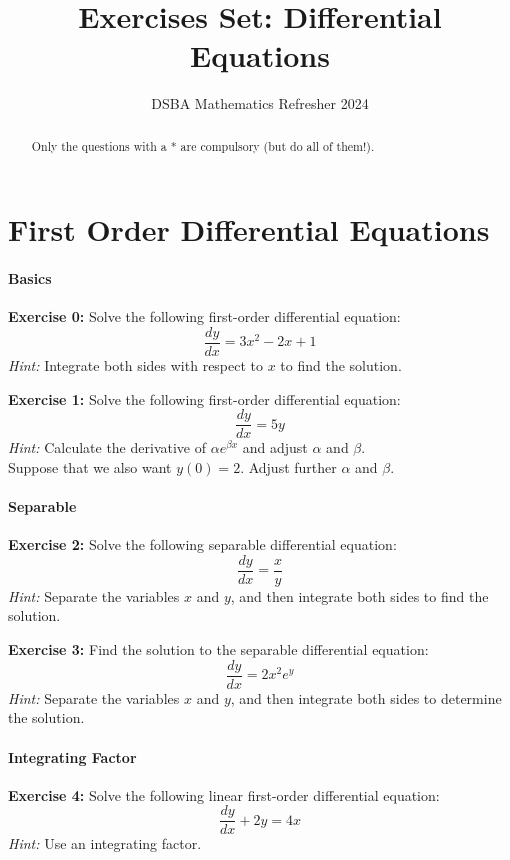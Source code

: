 \documentclass[]{article}
\title{Exercises Set: Differential Equations}
\author{DSBA Mathematics Refresher 2024}
\date{}
\begin{document}
	\maketitle
	
	\begin{abstract}
		Only the questions with a * are compulsory (but do all of them!).
	\end{abstract}	
	
	\section{First Order Differential Equations}
	\paragraph{Basics}\mbox{}
	
	\textbf{Exercise 0:}
	Solve the following first-order differential equation:
	$$
	\frac{dy}{dx} = 3x^2 - 2x + 1
	$$
	\textit{Hint:} Integrate both sides with respect to $x$ to find the solution.
	
	\textbf{Exercise 1:}
	Solve the following first-order differential equation:
	$$
	\frac{dy}{dx} = 5y
	$$
	\textit{Hint:} Calculate the derivative of $\alpha e^{\beta x}$ and adjust $\alpha$ and $\beta$.\\
	Suppose that we also want $y(0) = 2$. Adjust further $\alpha$ and $\beta$.
	
	
	\paragraph{Separable}\mbox{}
	
	\textbf{Exercise 2:}
	Solve the following separable differential equation:
	$$
	\frac{dy}{dx} = \frac{x}{y}
	$$
	\textit{Hint:} Separate the variables $x$ and $y$, and then integrate both sides to find the solution.
	
	\textbf{Exercise 3:}
	Find the solution to the separable differential equation:
	$$
	\frac{dy}{dx} = 2x^2 e^y
	$$
	\textit{Hint:} Separate the variables $x$ and $y$, and then integrate both sides to determine the solution.
	
	\paragraph{Integrating Factor}\mbox{}
	
	\textbf{Exercise 4:}
	Solve the following linear first-order differential equation:
	$$
	\frac{dy}{dx} + 2y = 4x
	$$
	\textit{Hint:} Use an integrating factor.
	
\end{document}
